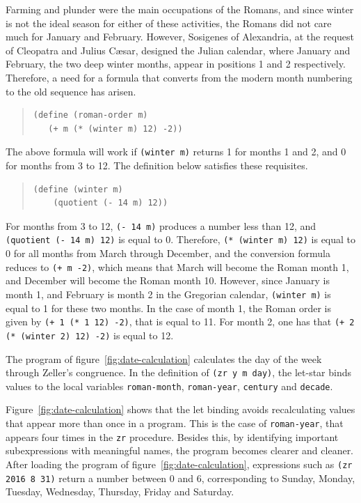 \documentclass[a4paper,12pt]{book}
\begin{document}
Farming and plunder were the main
occupations of the Romans, and since winter
is not the ideal season for
either of these activities,
the Romans did not care much for
January and February. However,
Sosigenes of Alexandria,
at the request of Cleopatra and
Julius C\ae sar, designed the
Julian calendar, where January
and February, the two deep winter
months, appear in  positions
1 and 2 respectively.
Therefore, a need for a formula
that converts from the modern
month numbering to the
old sequence has arisen.
\begin{quote}
\begin{verbatim}
(define (roman-order m)
   (+ m (* (winter m) 12) -2))
\end{verbatim}
\end{quote}
The above formula will work if \verb|(winter m)|
returns 1 for months 1 and 2, and
0 for months from 3 to 12. The definition
below satisfies these requisites.
\begin{quote}
\begin{verbatim}
(define (winter m)
    (quotient (- 14 m) 12))
\end{verbatim}
\end{quote}
For months from 3 to 12,
\verb|(- 14 m)| produces a number
less than 12, and \verb|(quotient (- 14 m) 12)|
is equal to 0. Therefore,
\verb|(* (winter m) 12)| is equal to
0 for all months from March through December,
and the conversion formula reduces
to \verb|(+ m -2)|, which means that
March will become the Roman month 1, and December
will become the Roman month 10.
However, since January is month 1,
and February is month 2 in the Gregorian
calendar, \verb|(winter m)| is
equal to 1 for these two months.
In the case of month 1,
the Roman order is given by
\verb|(+ 1 (* 1 12) -2)|, that is
equal to 11. For month 2, one has that
\verb|(+ 2 (* (winter 2) 12) -2)|
is equal to 12.

The program of figure~\ref{fig:date-calculation}
calculates the day of the week
through Zeller's congruence. In the definition
of \verb|(zr y m day)|, the let-star 
binds values to the local variables \verb|roman-month|,
\verb|roman-year|, \verb|century| and \verb|decade|.

Figure~\ref{fig:date-calculation} shows that
the let binding avoids recalculating values that
appear more than once in a program. This
is the case of \verb|roman-year|, that
appears four times in the \verb|zr| procedure.
Besides this, by identifying important
subexpressions with meaningful names, the
program becomes clearer and cleaner.
After loading the program of
figure~\ref{fig:date-calculation},
expressions
such as
\verb|(zr 2016 8 31)| return
a number between 0 and 6, corresponding to
Sunday, Monday, Tuesday, Wednesday,
Thursday, Friday and Saturday.
\end{document}
